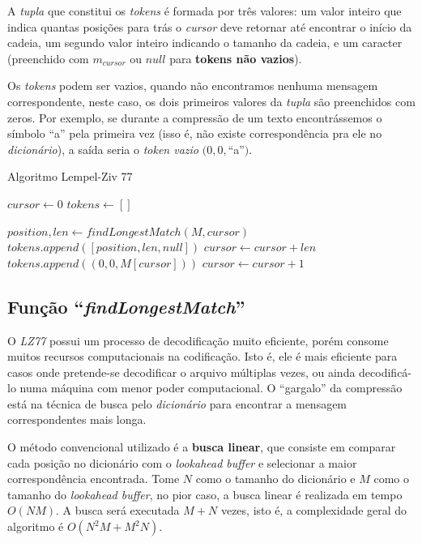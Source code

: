 A \emph{tupla} que constitui os \emph{tokens} é formada por três valores:
um valor inteiro que indica quantas posições para trás o \emph{cursor} deve retornar até encontrar o início da cadeia, 
um segundo valor inteiro indicando o tamanho da cadeia,
e um caracter (preenchido com $m_{cursor}$ ou $null$ para \textbf{tokens não vazios}).

Os \emph{tokens} podem ser vazios, quando não encontramos nenhuma mensagem correspondente, neste caso, os dois primeiros valores da \emph{tupla} são preenchidos com zeros.
Por exemplo, se durante a compressão de um texto encontrássemos o símbolo ``a'' pela primeira vez (isso é, não existe correspondência pra ele no \emph{dicionário}), a saída seria o \emph{token vazio} $(0, 0, $``a''$)$.

\begin{algorithm}[H]
\caption{Algoritmo Lempel-Ziv 77} \label{alg:lz77}
\begin{algorithmic}

	\State $cursor \gets 0$
	\State $tokens \gets []$

		\State $position, len \gets findLongestMatch(M, cursor)$ 
		 
			\State $tokens.append([position, len, null])$
			\State $cursor \gets cursor + len$
		\Else
			\State $tokens.append((0, 0, M[cursor]))$ 
			\State $cursor \gets cursor + 1$
		\EndIf
	\EndWhile
\end{algorithmic}
\end{algorithm}

\subsection{Função ``\emph{findLongestMatch}'' }
O \emph{LZ77} possui um processo de decodificação muito eficiente, porém consome muitos recursos computacionais na codificação. 
Isto é, ele é mais eficiente para casos onde pretende-se decodificar o arquivo múltiplas vezes, ou ainda decodificá-lo numa máquina com menor poder computacional. 
O ``gargalo'' da compressão está na técnica de busca pelo \emph{dicionário} para encontrar a mensagem correspondentes mais longa.

O método convencional utilizado é a \textbf{busca linear}, que consiste em comparar cada posição no dicionário com o \emph{lookahead buffer} e selecionar a maior correspondência encontrada. 
Tome $N$ como o tamanho do dicionário e $M$ como o tamanho do \emph{lookahead buffer}, no pior caso, a busca linear é realizada em tempo $O(NM)$. 
A busca será executada $M + N$ vezes, isto é, a complexidade geral do algoritmo é $O( N^{2}M + M^{2}N)$.

